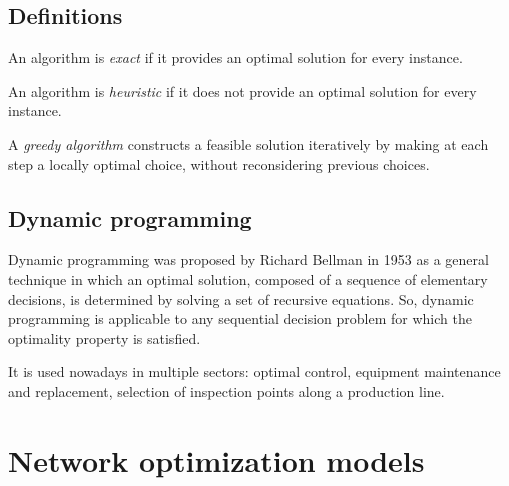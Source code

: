 \documentclass[12pt, a4paper]{report}
\newtheorem[style=M,bodystyle=\normalfont]{proposition}{Proposition}
\newtheorem[style=M,bodystyle=\normalfont]{theorem}{Theorem}
\newtheorem[style=M,bodystyle=\normalfont]{corollary}{Corollary}
\newtheorem[style=M,bodystyle=\normalfont]{lemma}{Lemma}
\newtheorem[style=M,bodystyle=\normalfont]{definition}{Definition}
\begin{document}
    \section{Definitions}
    \begin{definition}
        An algorithm is \emph{exact} if it provides an optimal solution for every instance. 
        
        An algorithm is \emph{heuristic} if it does not provide an optimal solution for every instance.

        A \emph{greedy algorithm} constructs a feasible solution iteratively by making at each step a locally optimal choice, without reconsidering previous choices. 
    \end{definition}

    \section{Dynamic programming}
    Dynamic programming was proposed by Richard Bellman in 1953 as a general technique in which an optimal solution, composed of a sequence of elementary decisions, is determined 
    by solving a set of recursive equations. So, dynamic programming is applicable to any sequential decision problem for which the optimality property is satisfied. 
    
    It is used nowadays in multiple sectors: optimal control, equipment maintenance and replacement, selection of inspection points along a production line. 

\newpage

\chapter{Network optimization models}
\end{document}
